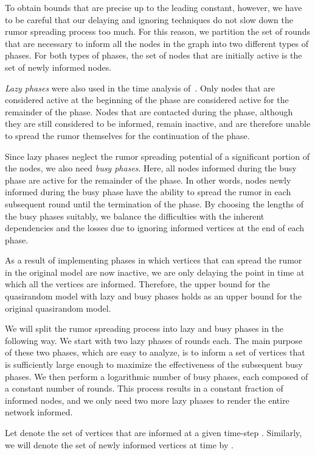 \documentclass[12pt]{article}
\begin{document}
{To obtain bounds that are precise up to the leading constant, however, we have to be careful that our delaying and ignoring techniques do not slow down the rumor spreading process too much. For this reason, we partition the set of rounds that are necessary to inform all the nodes in the graph into two different types of phases. For both types of phases, the set of nodes that are initially active is the set of newly informed nodes.
	
\emph{Lazy phases} were also used in the time analysis of~\cite{DFS08}. Only nodes that are considered active at the beginning of the phase are considered active for the remainder of the phase.
Nodes that are contacted during the phase, although they are still considered to be informed, remain inactive, and are therefore unable to spread the rumor themselves for the continuation of the phase.

Since lazy phases neglect the rumor spreading potential of a significant portion of the nodes, we also need \emph{busy phases}. 
Here, all nodes informed during the busy phase are active for the remainder of the phase. 
In other words, nodes newly informed during the busy phase have the ability to spread the rumor in each subsequent round until the termination of the phase. By choosing the lengths of the busy phases suitably, we balance the difficulties with the inherent dependencies and the losses due to ignoring informed vertices at the end of each phase.
	
As a result of implementing phases in which vertices that can spread the rumor in the original model are now inactive, we are only delaying the point in time at which all the vertices are informed.
Therefore, the upper bound for the quasirandom model with lazy and busy phases holds as an upper bound for the original quasirandom model.

We will split the rumor spreading process into lazy and busy phases in the following way. We start with two lazy phases of  rounds each. The main purpose of these two phases, which are easy to analyze, is to inform a set of vertices that is sufficiently large enough to maximize the effectiveness of the subsequent busy phases. We then perform a logarithmic number of busy phases, each composed of a constant number of rounds. This process results in a constant fraction of informed nodes, and we only need two more lazy phases to render the entire network informed.

Let  denote the set of vertices that are informed at a given time-step . Similarly, we will denote the set of newly informed vertices at time  by .

}
\end{document}
